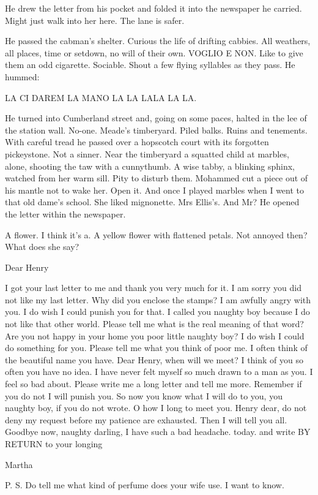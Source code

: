 He drew the letter from his pocket and folded it into the newspaper he
carried. Might just walk into her here. The lane is safer.

He passed the cabman's shelter. Curious the life of drifting cabbies. All
weathers, all places, time or setdown, no will of their own. VOGLIO E
NON. Like to give them an odd cigarette. Sociable. Shout a few flying
syllables as they pass. He hummed:


    LA CI DAREM LA MANO
    LA LA LALA LA LA.


He turned into Cumberland street and, going on some paces, halted
in the lee of the station wall. No-one. Meade's timberyard. Piled balks.
Ruins and tenements. With careful tread he passed over a hopscotch court
with its forgotten pickeystone. Not a sinner. Near the timberyard a
squatted child at marbles, alone, shooting the taw with a cunnythumb. A
wise tabby, a blinking sphinx, watched from her warm sill. Pity to disturb
them. Mohammed cut a piece out of his mantle not to wake her. Open it.
And once I played marbles when I went to that old dame's school. She liked
mignonette. Mrs Ellis's. And Mr? He opened the letter within the
newspaper.

A flower. I think it's a. A yellow flower with flattened petals. Not
annoyed then? What does she say?


    Dear Henry

I got your last letter to me and thank you very much for it. I am sorry
you did not like my last letter. Why did you enclose the stamps? I am
awfully angry with you. I do wish I could punish you for that. I called
you naughty boy because I do not like that other world. Please tell me
what is the real meaning of that word? Are you not happy in your home you
poor little naughty boy? I do wish I could do something for you. Please
tell me what you think of poor me. I often think of the beautiful name you
have. Dear Henry, when will we meet? I think of you so often you have no
idea. I have never felt myself so much drawn to a man as you. I feel so
bad about. Please write me a long letter and tell me more. Remember if you
do not I will punish you. So now you know what I will do to you, you
naughty boy, if you do not wrote. O how I long to meet you. Henry dear, do
not deny my request before my patience are exhausted. Then I will tell you
all. Goodbye now, naughty darling, I have such a bad headache. today. and
write BY RETURN to your longing


    Martha

P. S. Do tell me what kind of perfume does your wife use. I want to know.


